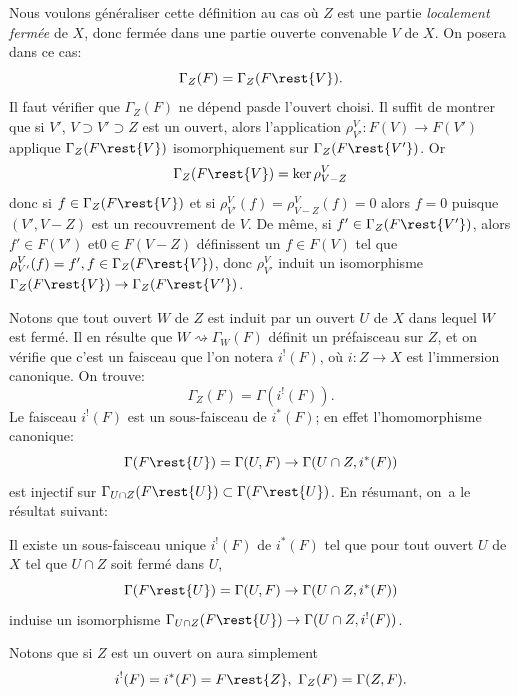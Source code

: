 Nous voulons g\'en\'eraliser cette d\'efinition au cas o\`u $Z$ est une partie \textit{localement ferm\'ee} de $X$, donc ferm\'ee dans une partie ouverte convenable $V$ de $X$. On posera dans ce cas:
\begin{equation} \label{eq:I.3} {\Gamma_Z(F)=\Gamma_Z(F\rest{V})}.
\end{equation}
Il faut v\'erifier que $\Gamma_Z(F)$ \og ne d\'epend pas\fg de l'ouvert choisi. Il suffit de montrer que si $V'$, $V\supset V' \supset Z$ est un ouvert, alors l'application $\rho_{V'}^V: F(V) \to F(V')$ applique $\Gamma_Z(F\rest{V})$ isomorphiquement sur $\Gamma_Z(F\rest{V'})$. Or
\begin{equation} \label{eq:I.4} { \Gamma_Z(F\rest{V}) = \ker \rho_{V-Z}^V}
\end{equation}
donc si $f\in \Gamma_Z(F\rest{V})$ et si $\rho_{V'}^V(f)=\rho_{V-Z}^V(f)=0$ alors $f=0$ puisque $(V', V-Z)$ est un recouvrement de $V$. De m\^eme, si $f'\in \Gamma_Z(F\rest{V'})$, alors $f'\in F(V')$ et\pageoriginale $0\in F(V-Z)$ d\'efinissent un $f\in F(V)$ tel que $\rho_{V'}^V(f)=f', f\in \Gamma_Z(F\rest{V})$, donc $\rho_{V'}^V$ induit un isomorphisme $\Gamma_Z(F\rest{V}) \to \Gamma_Z(F\rest{V'})$.

Notons que tout ouvert $W$ de $Z$ est induit par un ouvert $U$ de $X$ dans lequel $W$ est ferm\'e. Il en r\'esulte que $W \rightsquigarrow \Gamma_W(F)$ d\'efinit un pr\'efaisceau sur $Z$, et on v\'erifie que c'est un faisceau que l'on notera $i^!(F)$, o\`u $i: Z \to X$ est l'immersion canonique. On trouve:
\begin{equation} \label{eq:I.5}
\Gamma_Z(F)=\Gamma(i^!(F)).
\end{equation}
Le faisceau $i^!(F)$ est un sous-faisceau de $i^*(F)$; en effet l'homomorphisme canonique:
$$
\Gamma(F\rest{U})=\Gamma(U, F) \to \Gamma(U\cap Z, i^*(F))$$
est injectif sur $\Gamma_{U\cap Z}(F\rest{U}) \subset \Gamma(F\rest{U})$. En r\'esumant, on~a le r\'esultat suivant:

\begin{proposition} \label{I.1.1} Il existe un sous-faisceau unique $i^!(F)$ de $i^*(F)$ tel que pour tout ouvert $U$ de $X$ tel que $U\cap Z$ soit ferm\'e dans $U$,
$$
\Gamma(F\rest{U})=\Gamma(U, F) \to \Gamma(U\cap Z, i^*(F))$$
induise un isomorphisme $\Gamma_{U \cap Z}(F\rest{U}) \to \Gamma(U\cap Z, i^!(F))$.
\end{proposition}

Notons que si $Z$ est un ouvert on aura simplement
\begin{equation} \label{eq:I.6} {i^!(F)=i^*(F)=F\rest{Z}, \ \Gamma_Z(F)=\Gamma(Z, F)}.
\end{equation}


